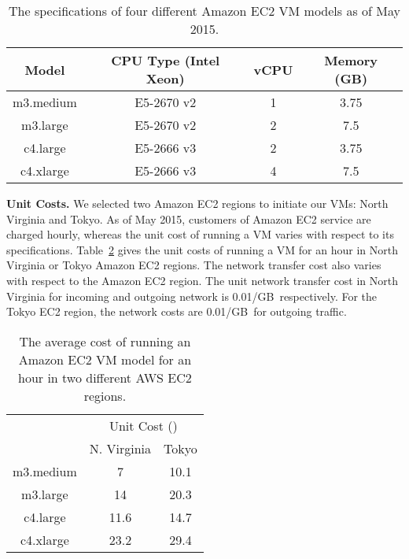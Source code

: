 \documentclass{llncs}
\begin{document}
\vspace{-0.4cm}
\begin{table}[hbt]
	\scriptsize
	\centering
	\begin{tabular}{|c|c|c|c|}

	\hline
	Model & CPU Type (Intel Xeon) &  vCPU & Memory (GB) \\
	\hline
	m3.medium	& E5-2670 v2 & 1 & 3.75 \\
	m3.large		& E5-2670 v2 & 2 & 7.5 \\
	c4.large		& E5-2666 v3 & 2 & 3.75 \\
	c4.xlarge		& E5-2666 v3 & 4 & 7.5 \\
	\hline
	\end{tabular}

	\caption{The specifications of four different Amazon EC2 VM models as of May 2015.}
	\label{table:cost:ec2_types}
\end{table}

\vspace{-0.9cm}
\textbf{Unit Costs.} We selected two Amazon EC2 regions to initiate our VMs: North Virginia and Tokyo. As of May 2015, customers of Amazon EC2 service are charged hourly, whereas the unit cost of running a VM varies with respect to its specifications. Table~\ref{table:cost:ec2_cost} gives the unit costs of running a VM for an hour in North Virginia or Tokyo Amazon EC2 regions. The network transfer cost also varies with respect to the Amazon EC2 region. The unit network transfer cost in North Virginia for incoming and outgoing network is 0.01/GB\, respectively. For the Tokyo EC2 region, the network costs are 0.01/GB\ for outgoing traffic.

\vspace{-0.3cm}
\begin{table}[hbt]
	\scriptsize
	\centering
	\begin{tabular}{|c|c|c|}
	\cline{2-3}
	\multicolumn{1}{c}{} & \multicolumn{2}{|c|}{Unit Cost ()} \\
	\cline{2-3}
	\multicolumn{1}{c|}{} & N. Virginia & Tokyo \\
	\hline
	m3.medium	& 7		& 10.1 \\
	m3.large		& 14		& 20.3 \\
	c4.large		& 11.6	& 14.7 \\	
	c4.xlarge		& 23.2	& 29.4 \\
	\hline
	\end{tabular}

	\caption{The average cost of running an Amazon EC2 VM model for an hour in two different AWS EC2 regions.}
	\label{table:cost:ec2_cost}
\end{table}
\end{document}
